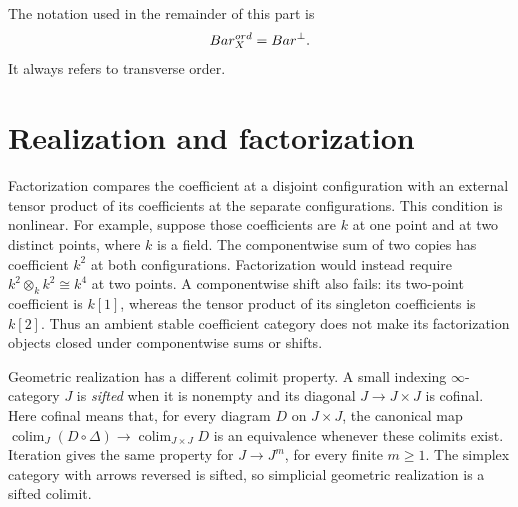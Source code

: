 The notation used in the remainder of this part is
\[
 Bar_X^{ord}=Bar^{\perp}.
\]
It always refers to transverse order.

\section{Realization and factorization}

Factorization compares the coefficient at a disjoint configuration with
an external tensor product of its coefficients at the separate configurations.
This condition is nonlinear. For example, suppose those coefficients are
$k$ at one point and at two distinct points, where $k$ is a field.
The componentwise sum of two copies has coefficient $k^2$ at both configurations.
Factorization would instead require $k^2\otimes_k k^2\cong k^4$ at two points.
A componentwise shift also fails: its two-point coefficient is $k[1]$,
whereas the tensor product of its singleton coefficients is $k[2]$.
Thus an ambient stable coefficient category does not make its
factorization objects closed under componentwise sums or shifts.

Geometric realization has a different colimit property.
A small indexing $\infty$-category $J$ is \emph{sifted} when it is nonempty
and its diagonal $J\to J\times J$ is cofinal.
Here cofinal means that, for every diagram $D$ on $J\times J$,
the canonical map $\operatorname*{colim}_{J}(D\circ\Delta)
\to\operatorname*{colim}_{J\times J}D$ is an equivalence whenever these colimits exist.
Iteration gives the same property for $J\to J^m$, for every finite $m\geq1$.
The simplex category with arrows reversed is sifted, so simplicial
geometric realization is a sifted colimit.

